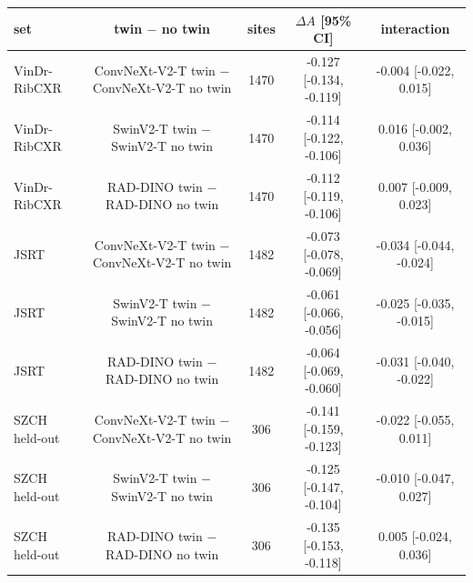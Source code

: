 \begin{tabular}{lcccc}
\toprule
set & twin $-$ no twin & sites & $\Delta A$ [95\% CI] & interaction \\
\midrule
VinDr-RibCXR & ConvNeXt-V2-T twin $-$ ConvNeXt-V2-T no twin & 1470 & -0.127 [-0.134, -0.119] & -0.004 [-0.022, 0.015] \\
VinDr-RibCXR & SwinV2-T twin $-$ SwinV2-T no twin & 1470 & -0.114 [-0.122, -0.106] & 0.016 [-0.002, 0.036] \\
VinDr-RibCXR & RAD-DINO twin $-$ RAD-DINO no twin & 1470 & -0.112 [-0.119, -0.106] & 0.007 [-0.009, 0.023] \\
JSRT & ConvNeXt-V2-T twin $-$ ConvNeXt-V2-T no twin & 1482 & -0.073 [-0.078, -0.069] & -0.034 [-0.044, -0.024] \\
JSRT & SwinV2-T twin $-$ SwinV2-T no twin & 1482 & -0.061 [-0.066, -0.056] & -0.025 [-0.035, -0.015] \\
JSRT & RAD-DINO twin $-$ RAD-DINO no twin & 1482 & -0.064 [-0.069, -0.060] & -0.031 [-0.040, -0.022] \\
SZCH held-out & ConvNeXt-V2-T twin $-$ ConvNeXt-V2-T no twin & 306 & -0.141 [-0.159, -0.123] & -0.022 [-0.055, 0.011] \\
SZCH held-out & SwinV2-T twin $-$ SwinV2-T no twin & 306 & -0.125 [-0.147, -0.104] & -0.010 [-0.047, 0.027] \\
SZCH held-out & RAD-DINO twin $-$ RAD-DINO no twin & 306 & -0.135 [-0.153, -0.118] & 0.005 [-0.024, 0.036] \\
\bottomrule
\end{tabular}
